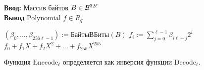 \begin{algorithm}[H]
\caption{$\text{Decode}_\ell: {\cal{B}}^{32\ell} \rightarrow R_q$}
\textbf{Ввод:} Массив байтов \( B \in {\cal{B}}^{32\ell} \)\\
\textbf{Вывод} Polynomial \( f \in R_q \)
\begin{algorithmic}[1]
\State \( (\beta_0, \ldots, \beta_{256\ell-1}) := \text{БайтыВБиты}(B) \)
    \State \( f_i := \sum_{j=0}^{\ell-1} \beta_{i\ell+j} 2^i \)
\EndFor
\State \Return \( f_0 + f_1X + f_2X^2 + \ldots + f_{255}X^{255} \)
\end{algorithmic}
\end{algorithm}
\noindent
Функция $\text{Enecode}_\ell$ определяется как инверсия функции $\text{Decode}_\ell$.